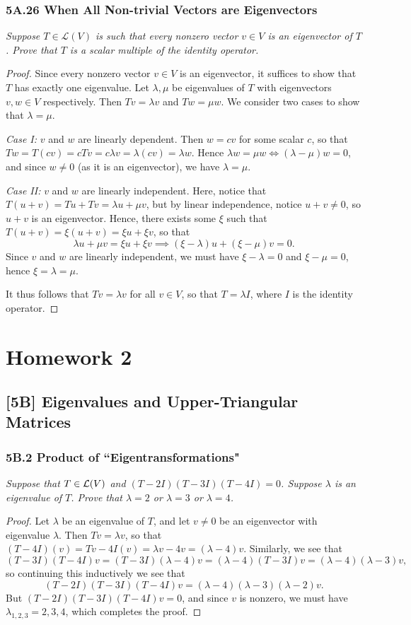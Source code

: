 \documentclass{article}
\begin{document}
\subsubsection*{5A.26 When All Non-trivial Vectors are Eigenvectors}
\textit{Suppose $T\in \mathcal L(V)$ is such that every nonzero vector $v\in V$ is an eigenvector of $T$. Prove that $T$ is a scalar multiple of the identity operator.}
\begin{proof}
Since every nonzero vector $v\in V$ is an eigenvector, it suffices to show that $T$ has exactly one eigenvalue. Let $\lambda, \mu$ be eigenvalues of $T$ with eigenvectors $v, w \in V$ respectively. Then $Tv = \lambda v$ and $Tw = \mu w$. We consider two cases to show that $\lambda = \mu$.

\textit{Case I:} $v$ and $w$ are linearly dependent. Then $w = cv$ for some scalar $c$, so that $Tw = T(cv) = cTv = c\lambda v = \lambda(cv) = \lambda w$. Hence $\lambda w = \mu w \iff (\lambda - \mu)w = 0$, and since $w\neq 0$ (as it is an eigenvector), we have $\lambda = \mu$.

\textit{Case II:} $v$ and $w$ are linearly independent. Here, notice that $T(u+v) = Tu + Tv = \lambda u + \mu v$, but by linear independence, notice $u + v\neq 0$, so $u+v$ is an eigenvector. Hence, there exists some $\xi$ such that  $T(u+v) = \xi (u+v) = \xi u + \xi v$, so that $$\lambda u + \mu v = \xi u+\xi v \implies (\xi - \lambda)u + (\xi - \mu)v = 0.$$
Since $v$ and $w$ are linearly independent, we must have $\xi - \lambda  = 0$ and $\xi - \mu = 0$, hence $\xi = \lambda = \mu$.

It thus follows that $Tv = \lambda v$ for all $v \in V$, so that $T = \lambda I$, where $I$ is the identity operator.
\end{proof}
\newpage
\section*{Homework 2}
\subsection*{[5B] Eigenvalues and Upper-Triangular Matrices}
\subsubsection*{5B.2 Product of ``Eigentransformations"}
\textit{Suppose that $T \in \mathcal L(V)$ and $(T-2I)(T-3I)(T-4I) = 0$. Suppose $\lambda$ is an eigenvalue of $T$. Prove that $\lambda = 2$ or $\lambda = 3$ or $\lambda = 4$.}
\begin{proof}
Let $\lambda$ be an eigenvalue of $T$, and let $v\neq 0$ be an eigenvector with eigenvalue $\lambda$. Then $Tv = \lambda v$, so that $(T-4I)(v) = Tv - 4I(v) = \lambda v - 4v = (\lambda  -4)v$. Similarly, we see that
$$(T-3I)(T-4I)v = (T-3I)(\lambda -4)v = (\lambda - 4)(T-3I)v = (\lambda - 4)(\lambda - 3)v,$$
so continuing this inductively we see that
$$(T-2I)(T-3I)(T-4I)v = (\lambda - 4)(\lambda - 3)(\lambda - 2)v.$$
But $(T-2I)(T-3I)(T-4I)v =0$, and since $v$ is nonzero, we must have $\lambda_{1,2,3} = 2,3,4$, which completes the proof.
\end{proof}
\end{document}

